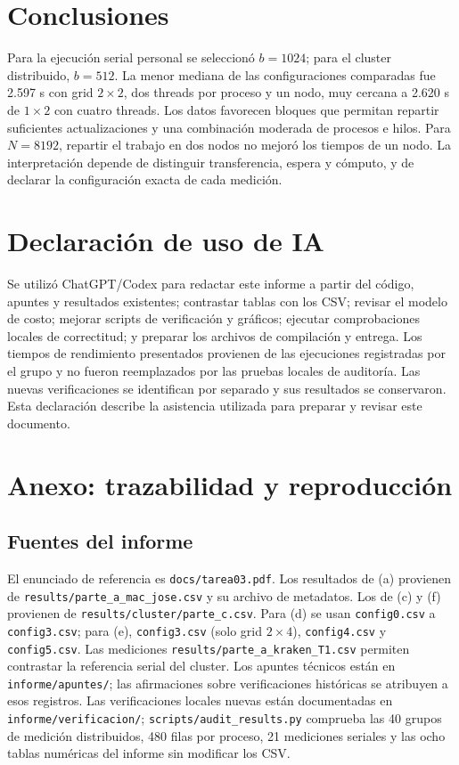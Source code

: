 \documentclass[
  spanish,
  11pt,
  a4paper,
]{article}
\begin{document}
\section{Conclusiones}\label{conclusiones}

Para la ejecución serial personal se seleccionó \(b=1024\); para el
cluster distribuido, \(b=512\). La menor mediana de las configuraciones
comparadas fue 2.597 s con grid \(2\times2\), dos threads por proceso y
un nodo, muy cercana a 2.620 s de \(1\times2\) con cuatro threads. Los
datos favorecen bloques que permitan repartir suficientes
actualizaciones y una combinación moderada de procesos e hilos. Para
\(N=8192\), repartir el trabajo en dos nodos no mejoró los tiempos de un
nodo. La interpretación depende de distinguir transferencia, espera y
cómputo, y de declarar la configuración exacta de cada medición.

\section{Declaración de uso de IA}\label{declaraciuxf3n-de-uso-de-ia}

Se utilizó ChatGPT/Codex para redactar este informe a partir del código,
apuntes y resultados existentes; contrastar tablas con los CSV; revisar
el modelo de costo; mejorar scripts de verificación y gráficos; ejecutar
comprobaciones locales de correctitud; y preparar los archivos de
compilación y entrega. Los tiempos de rendimiento presentados provienen
de las ejecuciones registradas por el grupo y no fueron reemplazados por
las pruebas locales de auditoría. Las nuevas verificaciones se
identifican por separado y sus resultados se conservaron. Esta
declaración describe la asistencia utilizada para preparar y revisar
este documento.

\section{Anexo: trazabilidad y
reproducción}\label{anexo-trazabilidad-y-reproducciuxf3n}

\subsection{Fuentes del informe}\label{fuentes-del-informe}

El enunciado de referencia es \texttt{docs/tarea03.pdf}. Los resultados
de (a) provienen de \texttt{results/parte\_a\_mac\_jose.csv} y su
archivo de metadatos. Los de (c) y (f) provienen de
\texttt{results/cluster/parte\_c.csv}. Para (d) se usan
\texttt{config0.csv} a \texttt{config3.csv}; para (e),
\texttt{config3.csv} (solo grid \(2\times4\)), \texttt{config4.csv} y
\texttt{config5.csv}. Las mediciones
\texttt{results/parte\_a\_kraken\_T1.csv} permiten contrastar la
referencia serial del cluster. Los apuntes técnicos están en
\texttt{informe/apuntes/}; las afirmaciones sobre verificaciones
históricas se atribuyen a esos registros. Las verificaciones locales
nuevas están documentadas en \texttt{informe/verificacion/};
\texttt{scripts/audit\_results.py} comprueba las 40 grupos de medición
distribuidos, 480 filas por proceso, 21 mediciones seriales y las ocho
tablas numéricas del informe sin modificar los CSV.
\end{document}
